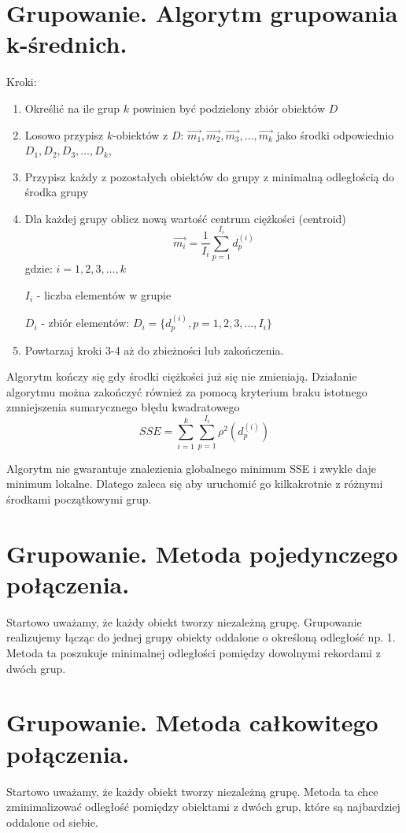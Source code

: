 \documentclass[a4paper,10pt]{article}
\begin{document}
\section{Grupowanie. Algorytm grupowania k-średnich.}
Kroki:
\begin{enumerate}
\item Określić na ile grup $k$ powinien być podzielony zbiór obiektów $D$
\item Losowo przypisz $k$-obiektów z $D$: $\overrightarrow{m_1}, \overrightarrow{m_2}, \overrightarrow{m_3}, \ldots, \overrightarrow{m_k}$ jako środki odpowiednio $D_1, D_2, D_3, \ldots, D_k$,
\item Przypisz każdy z pozostałych obiektów do grupy z minimalną odległością do środka grupy
\item Dla każdej grupy oblicz nową wartość centrum ciężkości (centroid)
\begin{equation}
\overrightarrow{m_i} = \frac{1}{I_i} \sum_{p=1}^{I_i} d_p^{(i)}
\end{equation}
gdzie:
$i=1,2,3,\ldots,k$

$I_i$ - liczba elementów w grupie

$D_i$ - zbiór elementów: $D_i = \{d_p^{(i)}, p = 1,2,3,\ldots,I_i\}$
\item Powtarzaj kroki 3-4 aż do zbieżności lub zakończenia.
\end{enumerate}

Algorytm kończy się gdy środki ciężkości już się nie zmieniają.
Działanie algorytmu można zakończyć również za pomocą kryterium braku istotnego zmniejszenia sumarycznego błędu kwadratowego 
\begin{equation}
SSE = \sum_{i=1}^{k} \sum_{p=1}^{I_i}\rho^2 (d_p^{(i)})
\end{equation}

Algorytm nie gwarantuje znalezienia globalnego minimum SSE i zwykle daje minimum lokalne. Dlatego zaleca się aby uruchomić go kilkakrotnie z różnymi środkami początkowymi grup.

\section{Grupowanie. Metoda pojedynczego połączenia.}
Startowo uważamy, że każdy obiekt tworzy niezależną grupę.
Grupowanie realizujemy łącząc do jednej grupy obiekty oddalone o określoną odległość np. 1.
Metoda ta poszukuje minimalnej odległości pomiędzy dowolnymi rekordami z dwóch grup.

\section{Grupowanie. Metoda całkowitego połączenia.}
Startowo uważamy, że każdy obiekt tworzy niezależną grupę.
Metoda ta chce zminimalizować odległość pomiędzy obiektami z dwóch grup, które są najbardziej oddalone od siebie.
\end{document}
